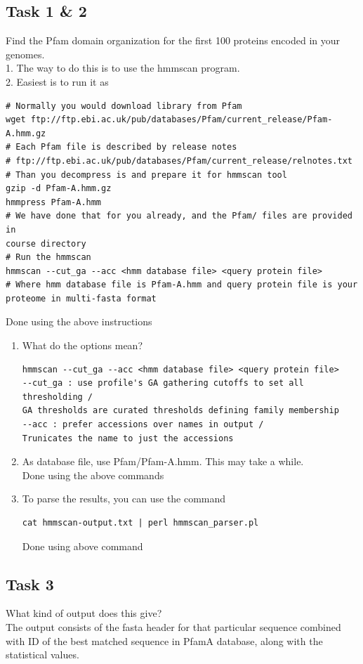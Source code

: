 \documentclass[a4paper,10pt]{article}
\begin{document}
\subsection*{Task 1 \& 2}
\color{Gray}
Find the Pfam domain organization for the first 100 proteins encoded in your genomes.\\
1. The way to do this is to use the hmmscan program.\\
2. Easiest is to run it as
\begin{verbatim}# Normally you would download library from Pfam
wget ftp://ftp.ebi.ac.uk/pub/databases/Pfam/current_release/Pfam-A.hmm.gz
# Each Pfam file is described by release notes
# ftp://ftp.ebi.ac.uk/pub/databases/Pfam/current_release/relnotes.txt
# Than you decompress is and prepare it for hmmscan tool
gzip -d Pfam-A.hmm.gz
hmmpress Pfam-A.hmm
# We have done that for you already, and the Pfam/ files are provided in
course directory
# Run the hmmscan
hmmscan --cut_ga --acc <hmm database file> <query protein file>
# Where hmm database file is Pfam-A.hmm and query protein file is your
proteome in multi-fasta format
\end{verbatim}\color{black}
Done using the above instructions

\begin{enumerate}[label=(\alph*)]
\item\color{Gray} What do the options mean?
\color{black}\begin{verbatim}
hmmscan --cut_ga --acc <hmm database file> <query protein file>
--cut_ga : use profile's GA gathering cutoffs to set all thresholding / 
GA thresholds are curated thresholds defining family membership
--acc : prefer accessions over names in output /
Trunicates the name to just the accessions
\end{verbatim}
\item \color{Gray}As database file, use Pfam/Pfam-A.hmm. This may take a while.\\
\color{black}Done using the above commands
\item \color{Gray}To parse the results, you can use the command
\begin{verbatim}
cat hmmscan-output.txt | perl hmmscan_parser.pl
\end{verbatim}
\color{black}Done using above command
\end{enumerate}

\subsection*{Task 3}
\color{Gray}What kind of output does this give?\\
\color{black}The output consists of the fasta header for that particular sequence combined with ID of the best matched sequence in PfamA database, along with the statistical values. 
\end{document}
